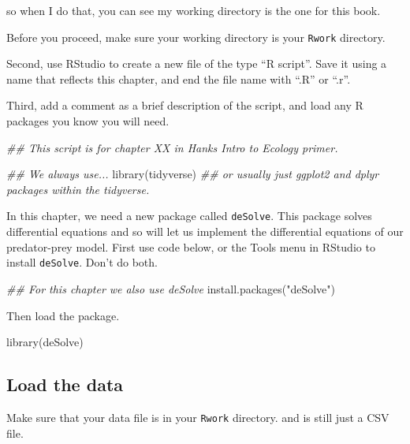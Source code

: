 \documentclass[
  letterpaper,
  DIV=11,
  numbers=noendperiod]{scrreprt}
\newenvironment{Shaded}{\begin{snugshade}}{\end{snugshade}}
\newcommand{\DocumentationTok}[1]{\textcolor[rgb]{0.37,0.37,0.37}{\textit{#1}}}
\newcommand{\FunctionTok}[1]{\textcolor[rgb]{0.28,0.35,0.67}{#1}}
\newcommand{\NormalTok}[1]{\textcolor[rgb]{0.00,0.23,0.31}{#1}}
\newcommand{\StringTok}[1]{\textcolor[rgb]{0.13,0.47,0.30}{#1}}
\begin{document}
so when I do that, you can see my working directory is the one for this
book.

Before you proceed, make sure your working directory is your
\texttt{Rwork} directory.

Second, use RStudio to create a new file of the type ``R script''. Save
it using a name that reflects this chapter, and end the file name with
``.R'' or ``.r''.

Third, add a comment as a brief description of the script, and load any
R packages you know you will need.

\begin{Shaded}
\begin{Highlighting}[]
\DocumentationTok{\#\# This script is for chapter XX in Hank\textquotesingle{}s Intro to Ecology primer.}

\DocumentationTok{\#\# We always use...}
\FunctionTok{library}\NormalTok{(tidyverse)}
\DocumentationTok{\#\# or usually just ggplot2 and dplyr packages within the tidyverse.}
\end{Highlighting}
\end{Shaded}

In this chapter, we need a new package called \texttt{deSolve}. This
package solves differential equations and so will let us implement the
differential equations of our predator-prey model. First use code below,
or the Tools menu in RStudio to install \texttt{deSolve}. Don't do both.

\begin{Shaded}
\begin{Highlighting}[]
\DocumentationTok{\#\# For this chapter we also use deSolve}
\FunctionTok{install.packages}\NormalTok{(}\StringTok{"deSolve"}\NormalTok{)}
\end{Highlighting}
\end{Shaded}

Then load the package.

\begin{Shaded}
\begin{Highlighting}[]
\FunctionTok{library}\NormalTok{(deSolve)}
\end{Highlighting}
\end{Shaded}

\subsection{Load the data}\label{load-the-data}

Make sure that your data file is in your \texttt{Rwork} directory. and
is still just a CSV file.
\end{document}
